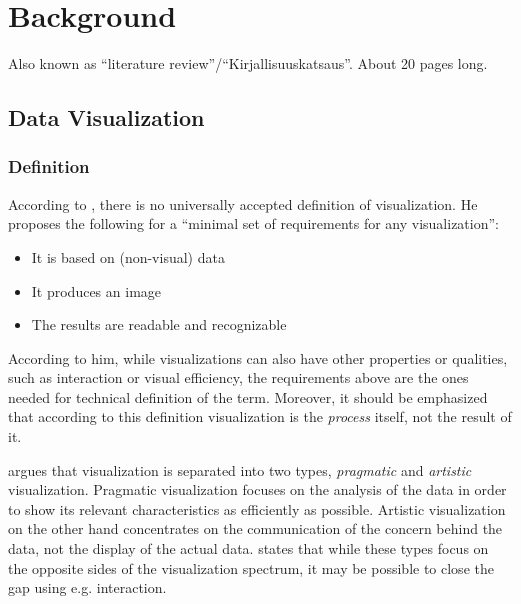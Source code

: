 
\chapter{Background}
\label{chapter:background} 

Also known as ``literature review''/``Kirjallisuuskatsaus''. About 20 pages long.


\section{Data Visualization}

\subsection{Definition}

According to \citet[chap.~3]{kosara_visualization_2007}, there is no universally accepted definition of visualization. He proposes the following for a ``minimal set of requirements for any visualization'':

\begin{itemize}
	\item It is based on (non-visual) data
	\item It produces an image
	\item The results are readable and recognizable
\end{itemize}

According to him, while visualizations can also have other properties or qualities, such as interaction or visual efficiency, the requirements above are the ones needed for technical definition of the term. Moreover, it should be emphasized that according to this definition visualization is the \emph{process} itself, not the result of it.

\citet[chap.~4]{kosara_visualization_2007} argues that visualization is separated into two types, \emph{pragmatic} and \emph{artistic} visualization. Pragmatic visualization focuses on the analysis of the data in order to show its relevant characteristics as efficiently as possible. Artistic visualization on the other hand concentrates on the communication of the concern behind the data, not the display of the actual data. \citeauthor{kosara_visualization_2007} states that while these types focus on the opposite sides of the visualization spectrum, it may be possible to close the gap using e.g. interaction.

